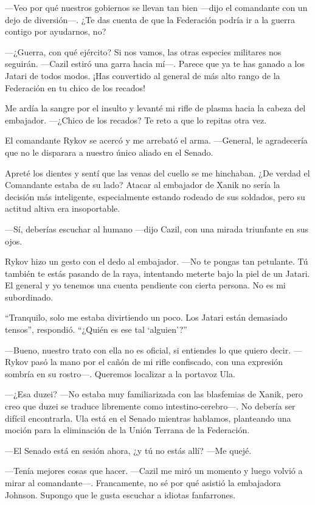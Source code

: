 —Veo por qué nuestros gobiernos se llevan tan bien —dijo el comandante con un dejo de diversión—. ¿Te das cuenta de que la Federación podría ir a la guerra contigo por ayudarnos, no?

—¿Guerra, con qué ejército? Si nos vamos, las otras especies militares nos seguirán. —Cazil estiró una garra hacia mí—. Parece que ya te has ganado a los Jatari de todos modos. ¡Has convertido al general de más alto rango de la Federación en tu chico de los recados!

Me ardía la sangre por el insulto y levanté mi rifle de plasma hacia la cabeza del embajador. —¿Chico de los recados? Te reto a que lo repitas otra vez.

El comandante Rykov se acercó y me arrebató el arma. —General, le agradecería que no le disparara a nuestro único aliado en el Senado.

Apreté los dientes y sentí que las venas del cuello se me hinchaban. ¿De verdad el Comandante estaba de su lado? Atacar al embajador de Xanik no sería la decisión más inteligente, especialmente estando rodeado de sus soldados, pero su actitud altiva era insoportable.

—Sí, deberías escuchar al humano —dijo Cazil, con una mirada triunfante en sus ojos.

Rykov hizo un gesto con el dedo al embajador. —No te pongas tan petulante. Tú también te estás pasando de la raya, intentando meterte bajo la piel de un Jatari. El general y yo tenemos una cuenta pendiente con cierta persona. No es mi subordinado.

``Tranquilo, solo me estaba divirtiendo un poco. Los Jatari están demasiado tensos'', respondió. ``¿Quién es ese tal ‘alguien’?''

—Bueno, nuestro trato con ella no es oficial, si entiendes lo que quiero decir. —Rykov pasó la mano por el cañón de mi rifle confiscado, con una expresión sombría en su rostro—. Queremos localizar a la portavoz Ula.

—¿Esa duzei? —No estaba muy familiarizada con las blasfemias de Xanik, pero creo que duzei se traduce libremente como intestino-cerebro—. No debería ser difícil encontrarla. Ula está en el Senado mientras hablamos, planteando una moción para la eliminación de la Unión Terrana de la Federación.

—El Senado está en sesión ahora, ¿y tú no estás allí? —Me quejé.

—Tenía mejores cosas que hacer. —Cazil me miró un momento y luego volvió a mirar al comandante—. Francamente, no sé por qué asistió la embajadora Johnson. Supongo que le gusta escuchar a idiotas fanfarrones.

